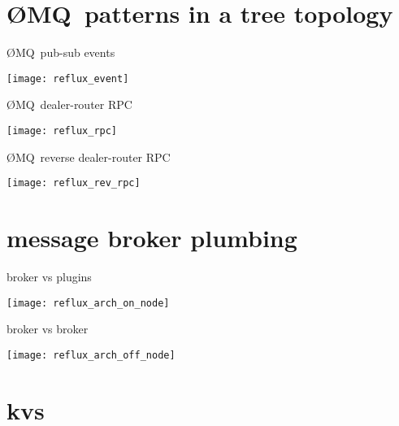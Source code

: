 \documentclass[default,pdf,colorBG,slideColor]{prosper}
\newcommand{\zMQ}{\O{}MQ}
\begin{document}
\part{\zMQ\ patterns in a tree topology}

\begin{slide}{\zMQ\ pub-sub events}{\small
\begin{center}
  \texttt{[image: reflux\_event]}
\end{center}
}\end{slide}

\begin{slide}{\zMQ\ dealer-router RPC}{\small
\begin{center}
  \texttt{[image: reflux\_rpc]}
\end{center}
}\end{slide}

\begin{slide}{\zMQ\ reverse dealer-router RPC}{\small
\begin{center}
  \texttt{[image: reflux\_rev\_rpc]}
\end{center}
}\end{slide}

\part{message broker plumbing}

\begin{slide}{broker vs plugins}{\small
\begin{center}
  \texttt{[image: reflux\_arch\_on\_node]}
\end{center}
}\end{slide}

\begin{slide}{broker vs broker}{\small
\begin{center}
  \texttt{[image: reflux\_arch\_off\_node]}
\end{center}
}\end{slide}

\part{kvs}
\end{document}
